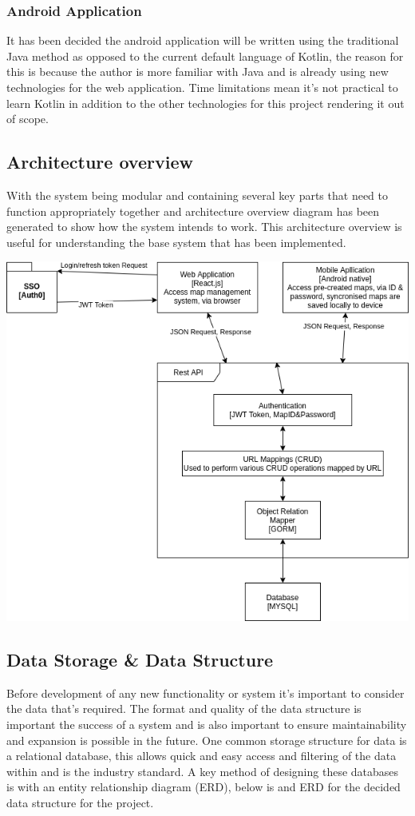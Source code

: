 \subsubsection{Android Application}
It has been decided the android application will be written using the traditional Java method as opposed to the current default language of Kotlin, the reason for this is because the author is more familiar with Java and is already using new technologies for the web application. Time limitations mean it's not practical to learn Kotlin in addition to the other technologies for this project rendering it out of scope.

\pagebreak
\subsection{Architecture overview}
With the system being modular and containing several key parts that need to function appropriately together and architecture overview diagram has been generated to show how the system intends to work. This architecture overview is useful for understanding the base system that has been implemented.

\includegraphics[width=\linewidth]{./images/designs/ArchitectureOverview.png}

\subsection{Data Storage \& Data Structure}
Before development of any new functionality or system it's important to consider the data that's required. The format and quality of the data structure is important the success of a system and is also important to ensure maintainability and expansion is possible in the future. One common storage structure for data is a relational database, this allows quick and easy access and filtering of the data within and is the industry standard. A key method of designing these databases is with an entity relationship diagram (ERD), below is and ERD for the decided data structure for the project.


